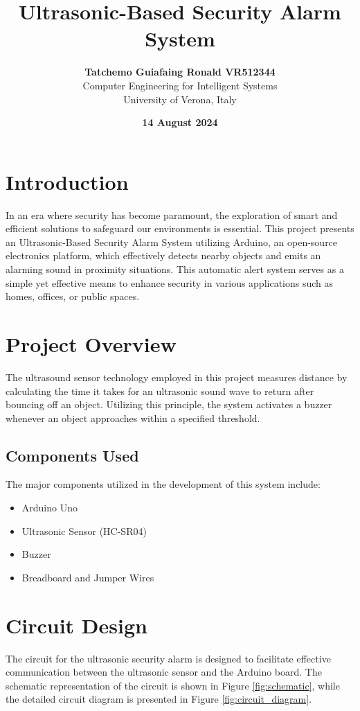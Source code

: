 \documentclass{article}
\title{\textbf{Ultrasonic-Based Security Alarm System}}
\author{\textbf{Tatchemo Guiafaing Ronald VR512344} \\ Computer Engineering for Intelligent Systems \\ University of Verona, Italy}
\date{\textbf{14 August 2024}}
\begin{document}

\justifying

\maketitle

\section{Introduction}
In an era where security has become paramount, the exploration of smart and efficient solutions to safeguard our environments is essential. This project presents an Ultrasonic-Based Security Alarm System utilizing Arduino, an open-source electronics platform, which effectively detects nearby objects and emits an alarming sound in proximity situations. This automatic alert system serves as a simple yet effective means to enhance security in various applications such as homes, offices, or public spaces.

\section{Project Overview}
The ultrasound sensor technology employed in this project measures distance by calculating the time it takes for an ultrasonic sound wave to return after bouncing off an object. Utilizing this principle, the system activates a buzzer whenever an object approaches within a specified threshold.

\subsection{Components Used}
The major components utilized in the development of this system include:
\begin{itemize}
    \item Arduino Uno
    \item Ultrasonic Sensor (HC-SR04)
    \item Buzzer
    \item Breadboard and Jumper Wires
\end{itemize}

\section{Circuit Design}
The circuit for the ultrasonic security alarm is designed to facilitate effective communication between the ultrasonic sensor and the Arduino board. The schematic representation of the circuit is shown in Figure \ref{fig:schematic}, while the detailed circuit diagram is presented in Figure \ref{fig:circuit_diagram}.
\end{document}
